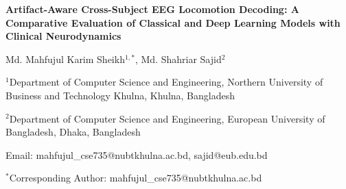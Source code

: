 \documentclass[11pt,a4paper]{article}
\begin{document}
\begin{center}
    {\fontsize{14pt}{18pt}\selectfont \textbf{Artifact-Aware Cross-Subject EEG Locomotion Decoding: A Comparative Evaluation of Classical and Deep Learning Models with Clinical Neurodynamics}\par}

    \vspace{12pt}

    {\fontsize{12pt}{15pt}\selectfont Md. Mahfujul Karim Sheikh$^{1,*}$, Md. Shahriar Sajid$^{2}$\par}

    \vspace{6pt}

    {\fontsize{10pt}{13pt}\selectfont $^{1}$Department of Computer Science and Engineering, Northern University of Business and Technology Khulna, Khulna, Bangladesh\par}
    {\fontsize{10pt}{13pt}\selectfont $^{2}$Department of Computer Science and Engineering, European University of Bangladesh, Dhaka, Bangladesh\par}

    \vspace{4pt}

    {\fontsize{10pt}{13pt}\selectfont Email: mahfujul\_cse735@nubtkhulna.ac.bd, sajid@eub.edu.bd\par}

    \vspace{2pt}
    {\fontsize{10pt}{13pt}\selectfont $^{*}$Corresponding Author: mahfujul\_cse735@nubtkhulna.ac.bd\par}
\end{center}

\vspace{10pt}
\end{document}
